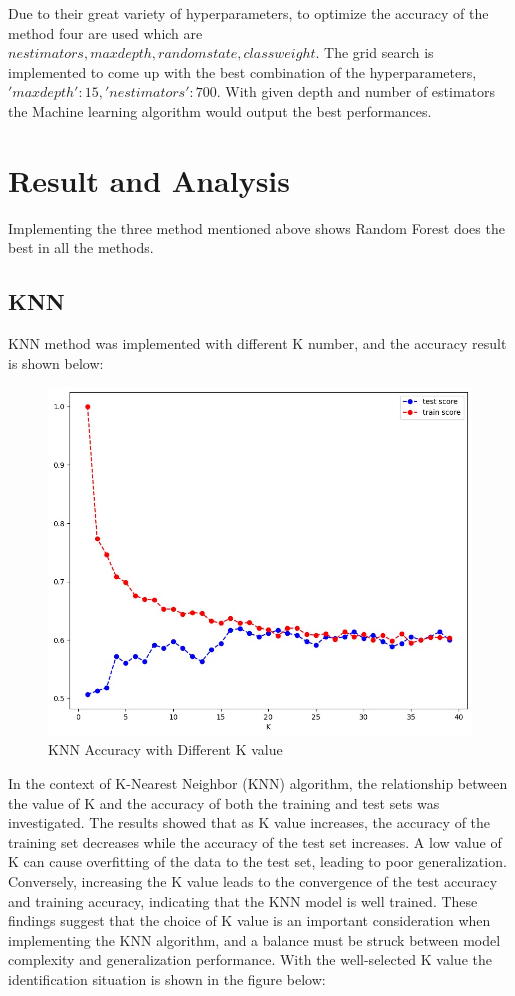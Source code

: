 \documentclass[conference]{IEEEtran}
\begin{document}
{Due to their great variety of hyperparameters, to optimize the accuracy of the method four are used which are $n estimators, max depth, random state, class weight$. The grid search is implemented to come up with the best combination of the hyperparameters, $ 'max depth': 15, 'n estimators': 700$. With given depth and number of estimators the Machine learning algorithm would output the best performances.\\
	
	
\section{Result and Analysis}
Implementing the three method mentioned above shows Random Forest does the best in all the methods. 
\subsection{KNN}
KNN method was implemented with different K number, and the accuracy result is shown below:
	\begin{figure}[h]
	\label{fig:foo}
	\begin{center}
	\includegraphics[scale=0.3]{KNNDiffK.jpeg}
	\caption{KNN Accuracy with Different K value}
	\end{center}
	\end{figure}
In the context of K-Nearest Neighbor (KNN) algorithm, the relationship between the value of K and the accuracy of both the training and test sets was investigated. The results showed that as K value increases, the accuracy of the training set decreases while the accuracy of the test set increases. A low value of K can cause overfitting of the data to the test set, leading to poor generalization. Conversely, increasing the K value leads to the convergence of the test accuracy and training accuracy, indicating that the KNN model is well trained. These findings suggest that the choice of K value is an important consideration when implementing the KNN algorithm, and a balance must be struck between model complexity and generalization performance. With the well-selected K value the identification situation is shown in the figure below:
}
\end{document}
